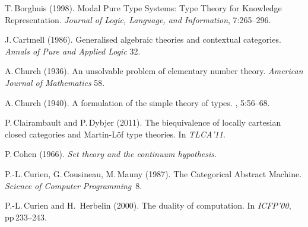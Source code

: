 \documentclass[11pt,twocolumn]{article}
\newcommand{\hide}[1]{}
\begin{document}
{\begin{thebibliography}{000}

T.\,Borghuis (1998).
\newblock Modal Pure Type Systems: Type Theory for Knowledge
Representation.  
\newblock \emph{Journal of Logic, Language, and Information}, 7:265--296. 

J.\,Cartmell (1986).
\newblock Generalised algebraic theories and contextual categories.
\newblock \emph{Annals of Pure and Applied Logic} 32. %


A.\,Church (1936).
\newblock An unsolvable problem of elementary number theory.
\newblock \emph{American Journal of Mathematics} 58.

A.\,Church (1940).
\newblock A formulation of the simple theory of types.
, 5:56--68. 
  
P.\,Clairambault and P.\,Dybjer (2011).
\newblock The biequivalence of locally cartesian closed categories and
Martin-L\"of type theories.
\newblock In \emph{TLCA'11}.

P.\,Cohen (1966).
\newblock \emph{Set theory and the continuum hypothesis}.

\hide{
\bibitem{CoquandNote}
T.\,Coquand and G.\,Jaber (2012).
\newblock A note on forcing and type theory.
\newblock \emph{Fundamenta Informatica} 100:43--52.
}


P.-L.\,Curien, G.\,Cousineau, M.\,Mauny (1987).
\newblock The Categorical Abstract Machine.
\newblock \emph{Science of Computer Programming}~8.

P.-L.\,Curien and H.\, Herbelin (2000).
\newblock The duality of computation.
\newblock In \emph{ICFP'00}, pp\,233--243.


\end{thebibliography}}
\end{document}

